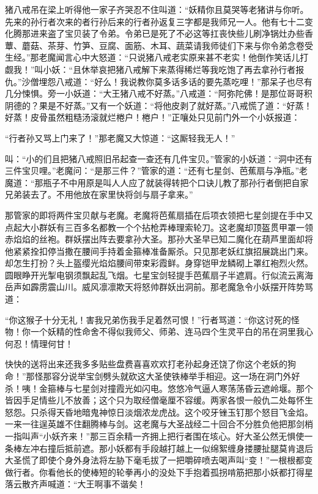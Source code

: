 \documentclass[12pt,UTF8]{ctexbook}
\begin{document}
猪八戒吊在梁上听得他一家子齐哭忍不住叫道：“妖精你且莫哭等老猪讲与你听。先来的孙行者次来的者行孙后来的行者孙返复三字都是我师兄一人。他有七十二变化腾那进来盗了宝贝装了令弟。令弟已是死了不必这等扛丧快些儿刷净锅灶办些香蕈、蘑菇、茶芽、竹笋、豆腐、面筋、木耳、蔬菜请我师徒们下来与你令弟念卷受生经。”那老魔闻言心中大怒道：“只说猪八戒老实原来甚不老实！他倒作笑话儿打觑我！”叫小妖：“且休举哀把猪八戒解下来蒸得稀烂等我吃饱了再去拿孙行者报仇。”沙僧埋怨八戒道：“好么！我说教你莫多话多话的要先蒸吃哩！”那呆子也尽有几分悚惧。旁一小妖道：“大王猪八戒不好蒸。”八戒道：“阿弥陀佛！是那位哥哥积阴德的？果是不好蒸。”又有一个妖道：“将他皮剥了就好蒸。”八戒慌了道：“好蒸！好蒸！皮骨虽然粗糙汤滚就烂棬户！棬户！”正嚷处只见前门外一个小妖报道：

“行者孙又骂上门来了！”那老魔又大惊道：“这厮轻我无人！”

叫：“小的们且把猪八戒照旧吊起查一查还有几件宝贝。”管家的小妖道：“洞中还有三件宝贝哩。”老魔问：“是那三件？”管家的道：“还有七星剑、芭蕉扇与净瓶。”老魔道：“那瓶子不中用原是叫人人应了就装得转把个口诀儿教了那孙行者倒把自家兄弟装去了。不用他放在家里快将剑与扇子拿来。”

那管家的即将两件宝贝献与老魔。老魔将芭蕉扇插在后项衣领把七星剑提在手中又点起大小群妖有三百多名都教一个个拈枪弄棒理索轮刀。这老魔却顶盔贯甲罩一领赤焰焰的丝袍。群妖摆出阵去要拿孙大圣。那孙大圣早已知二魔化在葫芦里面却将他紧紧拴扣停当撒在腰间手持着金箍棒准备厮杀。只见那老妖红旗招展跳出门来。却怎生打扮？头上盔缨光焰焰腰间带束彩霞鲜。身穿铠甲龙鳞砌上罩红袍烈火然。圆眼睁开光掣电钢须飘起乱飞烟。七星宝剑轻提手芭蕉扇子半遮肩。行似流云离海岳声如霹雳震山川。威风凛凛欺天将怒帅群妖出洞前。那老魔急令小妖摆开阵势骂道：

“你这猴子十分无礼！害我兄弟伤我手足着然可恨！”行者骂道：“你这讨死的怪物！你一个妖精的性命舍不得似我师父、师弟、连马四个生灵平白的吊在洞里我心何忍！情理何甘！

快快的送将出来还我多多贴些盘费喜喜欢欢打老孙起身还饶了你这个老妖的狗命！”那怪那容分说举宝剑劈头就砍这大圣使铁棒举手相迎。这一场在洞门外好杀！咦！金箍棒与七星剑对撞霞光如闪电。悠悠冷气逼人寒荡荡昏云遮岭堰。那个皆因手足情些儿不放善；这个只为取经僧毫厘不容缓。两家各恨一般仇二处每怀生怒怨。只杀得天昏地暗鬼神惊日淡烟浓龙虎战。这个咬牙锉玉钉那个怒目飞金焰。一来一往逞英雄不住翻腾棒与剑。这老魔与大圣战经二十回合不分胜负他把那剑梢一指叫声“小妖齐来！”那三百余精一齐拥上把行者围在垓心。好大圣公然无惧使一条棒左冲右撞后抵前遮。那小妖都有手段越打越上一似绵絮缠身搂腰扯腿莫肯退后大圣慌了即使个身外身法将左胁下毫毛拔了一把嚼碎喷去喝声叫“变！”一根根都变做行者。你看他长的使棒短的轮拳再小的没处下手抱着孤拐啃筋把那小妖都打得星落云散齐声喊道：“大王啊事不谐矣！
\end{document}
